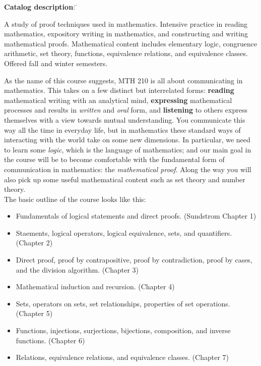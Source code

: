 \documentclass[11pt]{article}
\begin{document}
\begin{tabbing}
\textbf{Catalog description}: \hspace{0.2in} \= 
\parbox[t]{5in}{A study of proof techniques used in mathematics. Intensive practice in reading mathematics, expository writing in mathematics, and constructing and writing mathematical proofs. Mathematical content includes elementary logic, congruence arithmetic, set theory, functions, equivalence relations, and equivalence classes. Offered fall and winter semesters.} 
\end{tabbing}
As the name of this course suggests, MTH 210 is all about communicating in mathematics. This takes on a few distinct but interrelated forms: \textbf{reading} mathematical writing with an analytical mind, \textbf{expressing} mathematical processes and results in \emph{written} and \emph{oral} form, and \textbf{listening} to others express themselves with a view towards mutual understanding. You communicate this way all the time in everyday life, but in mathematics these standard ways of interacting with the world take on some new dimensions. In particular, we need to learn some \emph{logic}, which is the language of mathematics; and our main goal in the course will be to become comfortable with the fundamental form of communication in mathematics: the \emph{mathematical proof}. Along the way you will also pick up some useful mathematical content such as set theory and number theory. 
\\ 

The basic outline of the course looks like this:
\begin{itemize}\itemsep1pt
	\item Fundamentals of logical statements and direct proofs. (Sundstrom Chapter 1)
	\item Staements, logical operators, logical equivalence, sets, and quantifiers. (Chapter 2)
	\item Direct proof, proof by contrapositive, proof by contradiction, proof by cases, and the division algorithm. (Chapter 3)
	\item Mathematical induction and recursion. (Chapter 4)
	\item Sets, operators on sets, set relationships, properties of set operations. (Chapter 5)
	\item Functions, injections, surjections, bijections, composition, and inverse functions. (Chapter 6)
	\item Relations, equivalence relations, and equivalence classes. (Chapter 7)
\end{itemize}
\end{document}
